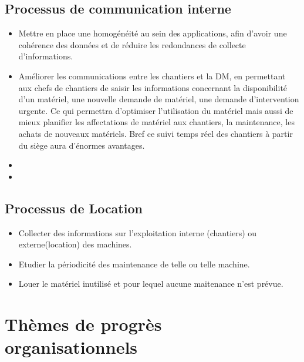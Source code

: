         \subsection{Processus de communication interne}
        \begin{itemize}
                \item Mettre en place une homogénéité au sein des applications, afin d'avoir une cohérence des données et de réduire les redondances de collecte d'informations.
                \item Améliorer les communications entre les chantiers et la DM, en permettant aux chefs de chantiers de saisir les informations concernant la disponibilité d'un matériel, une nouvelle demande de matériel, une demande d'intervention urgente. Ce qui permettra d'optimiser l'utilisation du matériel mais aussi de mieux planifier les affectations de matériel aux chantiers, la maintenance, les achats de nouveaux matériels. Bref ce suivi temps réel des chantiers à partir du siège aura d'énormes avantages.
                \item 
                \item 
        \end{itemize}
		
		\subsection{Processus de Location}
        \begin{itemize}
                \item Collecter des informations sur l'exploitation interne (chantiers) ou externe(location) des machines.
                \item Etudier la périodicité des maintenance de telle ou telle machine.
				\item Louer le matériel inutilisé et pour lequel aucune maitenance n'est prévue.
        \end{itemize}
		
\section{Thèmes de progrès organisationnels}

